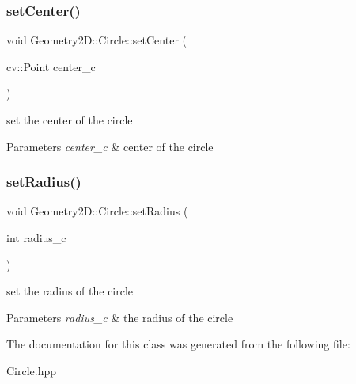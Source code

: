 \subsubsection{\texorpdfstring{set\+Center()}{setCenter()}}
{\footnotesize\ttfamily void Geometry2\+D\+::\+Circle\+::set\+Center (\begin{DoxyParamCaption}\item[{cv\+::\+Point}]{center\+\_\+c }\end{DoxyParamCaption})}

set the center of the circle 
\begin{DoxyParams}{Parameters}
{\em center\+\_\+c} & center of the circle \\
\hline
\end{DoxyParams}
\mbox{\label{class_geometry2_d_1_1_circle_acdeabe8582b65611dbc117cdc7604f18}} 
\subsubsection{\texorpdfstring{set\+Radius()}{setRadius()}}
{\footnotesize\ttfamily void Geometry2\+D\+::\+Circle\+::set\+Radius (\begin{DoxyParamCaption}\item[{int}]{radius\+\_\+c }\end{DoxyParamCaption})}

set the radius of the circle 
\begin{DoxyParams}{Parameters}
{\em radius\+\_\+c} & the radius of the circle \\
\hline
\end{DoxyParams}


The documentation for this class was generated from the following file\+:\begin{DoxyCompactItemize}
\item 
Circle.\+hpp\end{DoxyCompactItemize}
